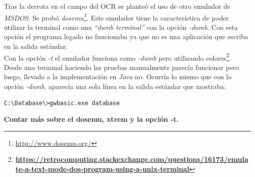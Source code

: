 \documentclass[10pt,a4paper]{article}
\begin{document}
Tras la derrota en el campo del OCR se planteó el uso de otro emulador de \emph{MSDOS}. Se probó \emph{dosemu\footnote{\url{http://www.dosemu.org/}}}. Este emulador tiene la característica de poder utilizar la terminal como una \emph{``dumb terminal''} con la opción \emph{-dumb}. Con esta opción el programa legado no funcionaba ya que no es una aplicación que escriba en la salida estándar.\\
Con la opción \emph{-t} el emulador funciona como \emph{-dumb} pero utilizando colores\footnote{\textbf{\url{https://retrocomputing.stackexchange.com/questions/16173/emulate-a-text-mode-dos-program-using-a-unix-terminal}}}. Desde una terminal haciendo las pruebas manualmente parecía funcionar pero luego, llevado a la implementación en \emph{Java} no. Ocurría lo mismo que con la opción \emph{-dumb}, aparecía una sola línea en la salida estándar que mostraba:

\begin{lstlisting}
C:\Database\>gwbasic.exe database
\end{lstlisting}


\textbf{Contar más sobre el dosemu, xtrem y la opción -t.}
\end{document}
